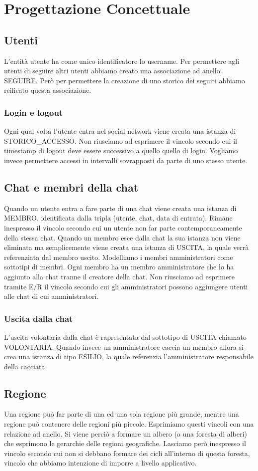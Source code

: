 \documentclass[a4paper,12pt]{report}
\begin{document}
\chapter{Progettazione Concettuale}
\section{Utenti}
L'entità utente ha come unico identificatore lo username. Per permettere agli utenti di seguire altri utenti abbiamo creato una associazione ad anello SEGUIRE. Però per permettere la creazione di uno storico dei seguiti abbiamo reificato questa associazione.
\subsection{Login e logout}
Ogni qual volta l'utente entra nel social network viene creata una istanza di STORICO\_ACCESSO. Non riusciamo ad esprimere il vincolo secondo cui il timestamp di logout deve essere successivo a quello quello di login. 
Vogliamo invece permettere accessi in intervalli sovrapposti da parte di uno stesso utente. 

\section{Chat e membri della chat}
Quando un utente entra a fare parte di una chat viene creata una istanza di MEMBRO, identificata dalla tripla (utente, chat, data di entrata). Rimane inespresso il vincolo secondo cui un utente non far parte contemporaneamente della stessa chat. Quando un membro esce dalla chat la sua istanza non viene eliminata ma semplicemente viene creata una istanza di USCITA, la quale verrà referenziata dal membro uscito.
Modelliamo i membri amministratori come sottotipi di membri. Ogni membro ha un membro amministratore che lo ha aggiunto alla chat tranne il creatore della chat. Non riusciamo ad esprimere tramite E/R il vincolo secondo cui gli amministratori possono aggiungere utenti alle chat di cui amministratori.
\subsection{Uscita dalla chat}
L'uscita volontaria dalla chat è rapresentata dal sottotipo di USCITA chiamato VOLONTARIA. Quando invece un amministratore caccia un membro allora si crea una istanza di tipo ESILIO, la quale referenzia l'amministratore responsabile della cacciata.

\section{Regione}
Una regione può far parte di una ed una sola regione più grande, mentre una regione può contenere delle regioni più piccole. Esprimiamo questi vincoli con una relazione ad anello. Si viene perciò a formare un albero (o una foresta di alberi) che esprimono le gerarchie delle regioni geografiche. Lasciamo però inespresso il vincolo secondo cui non si debbano formare dei cicli all'interno di questa foresta, vincolo che abbiamo intenzione di imporre a livello applicativo. 
\end{document}

